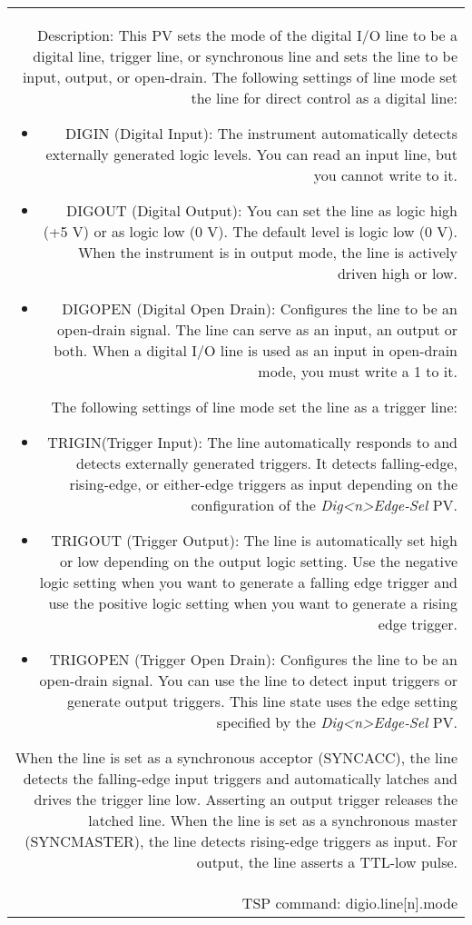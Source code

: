 \documentclass[openany]{article}
\begin{document}
\begin{tabular}{N}
			Description: This PV sets the mode of the digital I/O line to be a digital line, trigger line, or synchronous line and sets the line to be input, output, or open-drain. The following settings of line mode set the line for direct control as a digital line: \begin{itemize} \item DIGIN (Digital Input): The instrument automatically detects externally generated logic levels. You can read an input line, but you cannot write to it. \item DIGOUT (Digital Output): You can set the line as logic high (+5 V) or as logic low (0 V). The default level is logic low (0 V). When the instrument is in output mode, the line is actively driven high or low. \item DIGOPEN (Digital Open Drain): Configures the line to be an open-drain signal. The line can serve as an input, an output or both. When a digital I/O line is used as an input in open-drain mode, you must write a 1 to it. \end{itemize} The following settings of line mode set the line as a trigger line: \begin{itemize} \item TRIGIN(Trigger Input): The line automatically responds to and detects externally generated triggers. It detects falling-edge, rising-edge, or either-edge triggers as input depending on the configuration of the \emph{Dig{\textless n\textgreater}Edge-Sel} PV. \item TRIGOUT (Trigger Output): The line is automatically set high or low depending on the output logic setting. Use the negative logic setting when you want to generate a falling edge trigger and use the positive logic setting when you want to generate a rising edge trigger. \item TRIGOPEN (Trigger Open Drain): Configures the line to be an open-drain signal. You can use the line to detect input triggers or generate output triggers. This line state uses the edge setting specified by the \emph{Dig{\textless n\textgreater}Edge-Sel} PV. \end{itemize} When the line is set as a synchronous acceptor (SYNCACC), the line detects the falling-edge input triggers and automatically latches and drives the trigger line low. Asserting an output trigger releases the latched line. When the line is set as a synchronous master (SYNCMASTER), the line detects rising-edge triggers as input. For output, the line asserts a TTL-low pulse. \\
			TSP command: digio.line[n].mode
		\end{tabular}
\end{document}
